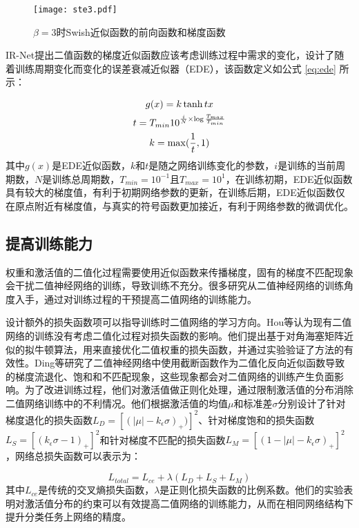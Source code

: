 \begin{figure}[htb]
  \centering
  \texttt{[image: ste3.pdf]}
  \caption{$\beta = 3$时Swish近似函数的前向函数和梯度函数}
  \label{fig:swishsign}
\end{figure}

IR-Net\cite{irnet}提出二值函数的梯度近似函数应该考虑训练过程中需求的变化，设计了随着训练周期变化而变化的误差衰减近似器（EDE），该函数定义如公式 \eqref{eq:ede} 所示：

\begin{gather}
  \label{eq:ede}
  g(x) = k \tanh tx \\
  t = T_{min} 10^{\frac{i}{N} \times \log \frac{T_{max}}{T_{min}}} \notag \\
  k = \max(\frac{1}{t}, 1) \notag
\end{gather}
其中$g(x)$是EDE近似函数，$k$和$t$是随之网络训练变化的参数，$i$是训练的当前周期数，$N$是训练总周期数，$T_{min} = 10^{-1}$且$T_{max} = 10^{1}$，在训练初期，EDE近似函数具有较大的梯度值，有利于初期网络参数的更新，在训练后期，EDE近似函数仅在原点附近有梯度值，与真实的符号函数更加接近，有利于网络参数的微调优化。

\subsection{提高训练能力}

权重和激活值的二值化过程需要使用近似函数来传播梯度，固有的梯度不匹配现象会干扰二值神经网络的训练，导致训练不充分。很多研究从二值神经网络的训练角度入手，通过对训练过程的干预提高二值网络的训练能力。

设计额外的损失函数项可以指导训练时二值网络的学习方向。Hou等\cite{lab}认为现有二值网络的训练没有考虑二值化过程对损失函数的影响。他们提出基于对角海塞矩阵近似的拟牛顿算法，用来直接优化二值权重的损失函数，并通过实验验证了方法的有效性。Ding等\cite{ding2019regularizing}研究了二值神经网络中使用截断函数作为二值化反向近似函数导致的梯度流退化、饱和和不匹配现象，这些现象都会对二值网络的训练产生负面影响。为了改进训练过程，他们对激活值做正则化处理，通过限制激活值的分布消除二值网络训练中的不利情况。他们根据激活值的均值$\mu$和标准差$\sigma$分别设计了针对梯度退化的损失函数$L_D = [(|\mu|-k_{\epsilon}\sigma)_+)]^2$、针对梯度饱和的损失函数$L_S = [(k_{\epsilon}\sigma - 1)_+]^2$和针对梯度不匹配的损失函数$L_M = [(1 - |\mu| - k_{\epsilon}\sigma)_+]^2$，网络总损失函数可以表示为：

\begin{equation}
  L_{total} = L_{ce} + \lambda (L_D + L_S + L_M)
\end{equation}
其中$L_{ce}$是传统的交叉熵损失函数，$\lambda$是正则化损失函数的比例系数。他们的实验表明对激活值分布的约束可以有效提高二值网络的训练能力，从而在相同网络结构下提升分类任务上网络的精度。

